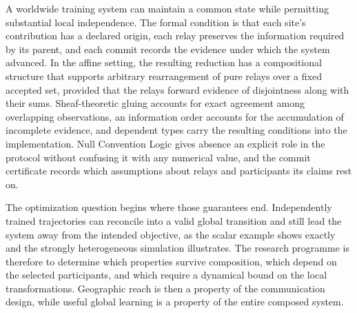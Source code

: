 \documentclass[11pt]{article}
\theoremstyle{definition}
\theoremstyle{remark}
\begin{document}
A worldwide training system can maintain a common state while permitting substantial local independence. The formal condition is that each site's contribution has a declared origin, each relay preserves the information required by its parent, and each commit records the evidence under which the system advanced. In the affine setting, the resulting reduction has a compositional structure that supports arbitrary rearrangement of pure relays over a fixed accepted set, provided that the relays forward evidence of disjointness along with their sums. Sheaf-theoretic gluing accounts for exact agreement among overlapping observations, an information order accounts for the accumulation of incomplete evidence, and dependent types carry the resulting conditions into the implementation. Null Convention Logic gives absence an explicit role in the protocol without confusing it with any numerical value, and the commit certificate records which assumptions about relays and participants its claims rest on.

The optimization question begins where those guarantees end. Independently trained trajectories can reconcile into a valid global transition and still lead the system away from the intended objective, as the scalar example shows exactly and the strongly heterogeneous simulation illustrates. The research programme is therefore to determine which properties survive composition, which depend on the selected participants, and which require a dynamical bound on the local transformations. Geographic reach is then a property of the communication design, while useful global learning is a property of the entire composed system.
\end{document}
